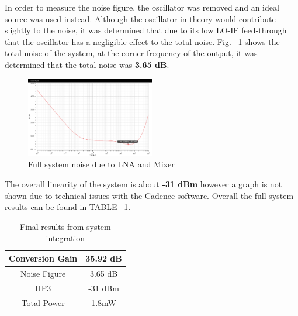 In order to measure the noise figure, the oscillator was removed and an ideal source was used instead. Although the oscillator in theory would contribute slightly to the noise, it was determined that due to its low LO-IF feed-through that the oscillator has a negligible effect to the total noise. Fig. ~\ref{fig:fullsystemnoise} shows the total noise of the system, at the corner frequency of the output, it was determined that the total noise was {\bf 3.65 dB}.

\begin{figure}[h]
   \centering
    \includegraphics[width=0.5\textwidth]{figures/FullSysNoiseFigure.png}
    \caption{Full system noise due to LNA and Mixer }
    \label{fig:fullsystemnoise}
\end{figure}

The overall linearity of the system is about {\bf -31 dBm} however a graph is not shown due to technical issues with the Cadence software. Overall the full system results can be found in TABLE ~\ref{tab:systemresults}.


\begin{table}[h]
\begin{center}
	\begin{tabular}{ |c | c | }
 		\hline                      
  		Conversion Gain & 35.92 dB \\ \hline
  		Noise Figure & 3.65 dB \\ \hline
  		IIP3 & -31 dBm\\ \hline
		Total Power & 1.8mW \\
  		\hline  
	\end{tabular}

\end{center}
\caption{Final results from system integration}
\label{tab:systemresults}
\end{table}

